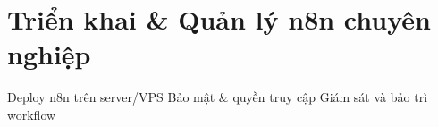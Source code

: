 \chapter{Triển khai \& Quản lý n8n chuyên nghiệp}
Deploy n8n trên server/VPS
Bảo mật \& quyền truy cập
Giám sát và bảo trì workflow